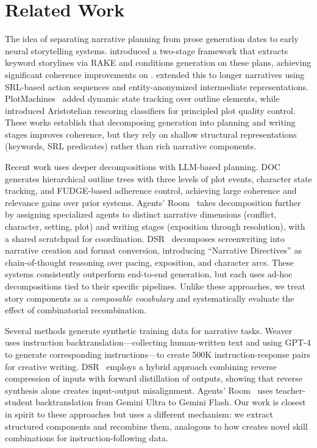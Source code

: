 \section{Related Work}
\label{sec:related}

The idea of separating narrative planning from prose generation dates to early neural storytelling systems.
\citet{yao2019planandwrite} introduced a two-stage framework that extracts keyword storylines via RAKE and conditions generation on these plans, achieving significant coherence improvements on \rocstories.
\citet{fan2019strategies} extended this to longer narratives using SRL-based action sequences and entity-anonymized intermediate representations.
PlotMachines~\cite{rashkin2020plotmachines} added dynamic state tracking over outline elements, while \citet{goldfarb2020aristotelian} introduced Aristotelian rescoring classifiers for principled plot quality control.
These works establish that decomposing generation into planning and writing stages improves coherence, but they rely on shallow structural representations (keywords, SRL predicates) rather than rich narrative components.

Recent work uses deeper decompositions with LLM-based planning.
DOC~\cite{yang2023doc} generates hierarchical outline trees with three levels of plot events, character state tracking, and FUDGE-based adherence control, achieving large coherence and relevance gains over prior systems.
Agents' Room~\cite{huot2024agentsroom} takes decomposition further by assigning specialized agents to distinct narrative dimensions (conflict, character, setting, plot) and writing stages (exposition through resolution), with a shared scratchpad for coordination.
DSR~\cite{dsr2025} decomposes screenwriting into narrative creation and format conversion, introducing ``Narrative Directives'' as chain-of-thought reasoning over pacing, exposition, and character arcs.
These systems consistently outperform end-to-end generation, but each uses ad-hoc decompositions tied to their specific pipelines.
Unlike these approaches, we treat story components as a \emph{composable vocabulary} and systematically evaluate the effect of combinatorial recombination.

Several methods generate synthetic training data for narrative tasks.
Weaver~\cite{xie2024weaver} uses instruction backtranslation---collecting human-written text and using GPT-4 to generate corresponding instructions---to create 500K instruction-response pairs for creative writing.
DSR~\cite{dsr2025} employs a hybrid approach combining reverse compression of inputs with forward distillation of outputs, showing that reverse synthesis alone creates input-output misalignment.
Agents' Room~\cite{huot2024agentsroom} uses teacher-student backtranslation from Gemini Ultra to Gemini Flash.
Our work is closest in spirit to these approaches but uses a different mechanism: we extract structured components and recombine them, analogous to how \skillmix creates novel skill combinations for instruction-following data.

